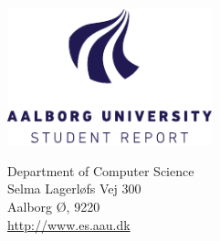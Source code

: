 
{}
\thispagestyle{empty}
\setcounter{page}{1} %
\begin{minipage}[t]{0.48\textwidth}
\vspace*{-25pt}			%
\includegraphics[height=4cm]{media/aau_logo_en.pdf}
\end{minipage}
\hfill
\begin{minipage}[t]{0.48\textwidth}
{\small 

Department of Computer Science \\
Selma Lagerløfs Vej 300 \\
Aalborg Ø, 9220 \\
\url{http://www.es.aau.dk}}
\end{minipage}

\vspace*{1cm}

